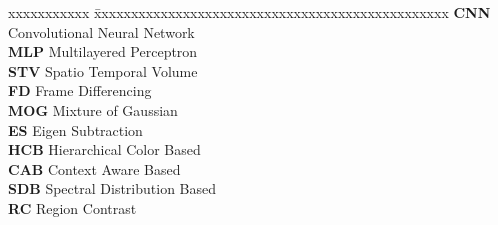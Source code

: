 \abbreviations
\noindent 
\begin{tabbing}
xxxxxxxxxxx \= xxxxxxxxxxxxxxxxxxxxxxxxxxxxxxxxxxxxxxxxxxxxxxxx \kill
\textbf{CNN}   \> Convolutional Neural Network \\
\textbf{MLP}   \> Multilayered Perceptron \\
\textbf{STV} \> Spatio Temporal Volume \\
\textbf{FD} \> Frame Differencing \\
\textbf{MOG} \> Mixture of Gaussian \\
\textbf{ES} \> Eigen Subtraction \\
\textbf{HCB} \> Hierarchical Color Based \\
\textbf{CAB} \> Context Aware Based \\
\textbf{SDB} \> Spectral Distribution Based \\
\textbf{RC} \> Region Contrast \\
\end{tabbing}
